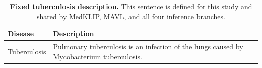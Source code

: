 \begin{table}[t]
\centering
\caption{\textbf{Fixed tuberculosis description.} This sentence is defined for this study and shared by MedKLIP, MAVL, and all four inference branches.}
\label{tab:supp-added-disease-prompts}
\footnotesize
\setlength{\tabcolsep}{4pt}
\begin{tabular*}{\textwidth}{@{\extracolsep{\fill}}lp{}@{}}
\toprule
Disease & Description \\
\midrule
Tuberculosis & Pulmonary tuberculosis is an infection of the lungs caused by Mycobacterium tuberculosis. \\
\bottomrule
\end{tabular*}
\end{table}
